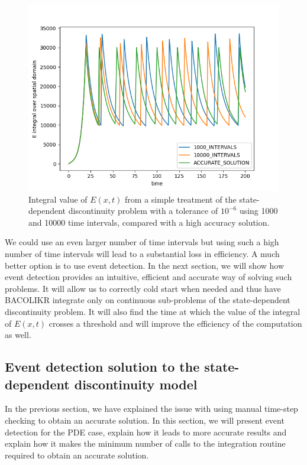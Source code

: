 \begin{figure}[H]
\centering
\includegraphics[width=0.7\linewidth]{./figures/pde_state_disc_naive_1000vs10000}
\caption{Integral value of $E(x, t)$ from a simple treatment of the state-dependent discontinuity problem with a tolerance of $10^{-6}$ using 1000 and 10000 time intervals, compared with a high accuracy solution.}
\label{fig:pde_state_disc_naive_1000vs10000}
\end{figure}

We could use an even larger number of time intervals but using such a high number of time intervals will lead to a substantial loss in efficiency. A much better option is to use event detection. In the next section, we will show how event detection provides an intuitive, efficient and accurate way of solving such problems. It will allow us to correctly cold start when needed and thus have BACOLIKR integrate only on continuous sub-problems of the state-dependent discontinuity problem. It will also find the time at which the value of the integral of $E(x, t)$ crosses a threshold and will improve the efficiency of the computation as well.

\subsection{Event detection solution to the state-dependent discontinuity model}
\label{subsubsection:pde_state_event_detection}
In the previous section, we have explained the issue with using manual time-step checking to obtain an accurate solution. In this section, we will present event detection for the PDE case, explain how it leads to more accurate results and explain how it makes the minimum number of calls to the integration routine required to obtain an accurate solution.

